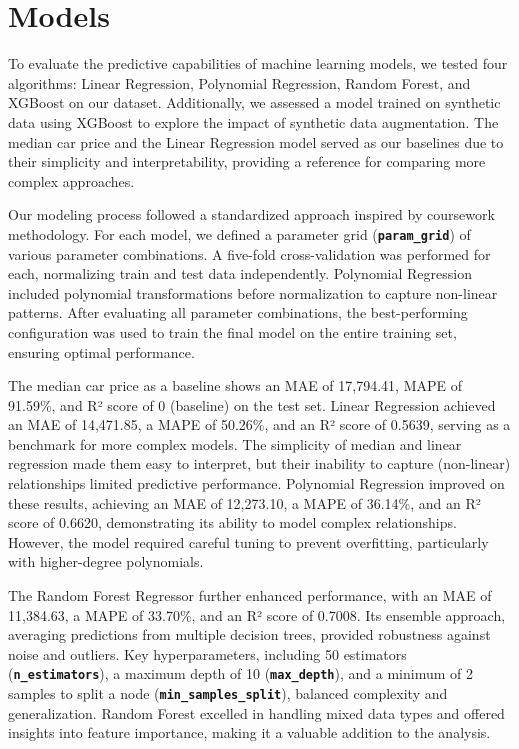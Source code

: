 \documentclass[a4paper,oneside,bibliography=totoc]{scrbook}
\begin{document}
\chapter{Models}
\label{cha:models}

To evaluate the predictive capabilities of machine learning models, we tested four algorithms: Linear Regression, Polynomial Regression, Random Forest, and XGBoost on our dataset. Additionally, we assessed a model trained on synthetic data using XGBoost to explore the impact of synthetic data augmentation. The median car price and the Linear Regression model served as our baselines due to their simplicity and interpretability, providing a reference for comparing more complex approaches.

Our modeling process followed a standardized approach inspired by coursework methodology. For each model, we defined a parameter grid (\textbf{\texttt{param\_grid}}) of various parameter combinations. A five-fold cross-validation was performed for each, normalizing train and test data independently. Polynomial Regression included polynomial transformations before normalization to capture non-linear patterns. After evaluating all parameter combinations, the best-performing configuration was used to train the final model on the entire training set, ensuring optimal performance.

The median car price as a baseline shows an MAE of 17,794.41, MAPE of 91.59\%, and  R² score of 0 (baseline) on the test set. Linear Regression achieved an MAE of 14,471.85, a MAPE of 50.26\%, and an R² score of 0.5639, serving as a benchmark for more complex models. The simplicity of median and linear regression made them easy to interpret, but their inability to capture (non-linear) relationships limited predictive performance. Polynomial Regression improved on these results, achieving an MAE of 12,273.10, a MAPE of 36.14\%, and an R² score of 0.6620, demonstrating its ability to model complex relationships. However, the model required careful tuning to prevent overfitting, particularly with higher-degree polynomials.

The Random Forest Regressor further enhanced performance, with an MAE of 11,384.63, a MAPE of 33.70\%, and an R² score of 0.7008. Its ensemble approach, averaging predictions from multiple decision trees, provided robustness against noise and outliers. Key hyperparameters, including 50 estimators (\textbf{\texttt{n\_estimators}}), a maximum depth of 10 (\textbf{\texttt{max\_depth}}), and a minimum of 2 samples to split a node (\textbf{\texttt{min\_samples\_split}}), balanced complexity and generalization. Random Forest excelled in handling mixed data types and offered insights into feature importance, making it a valuable addition to the analysis.
\end{document}
